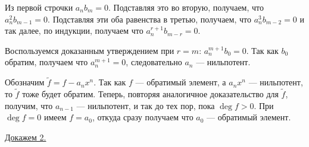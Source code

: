 \begin{Proof}
\begin{Proof}
            Из первой строчки $a_nb_m = 0$. Подставляя это во вторую, получаем, что $a_n^2b_{m - 1} = 0$. Подставляя эти оба равенства в третью,
            получаем, что $a_n^3b_{m - 2} = 0$ и так далее, по индукции, получаем что $a_n^{r + 1}b_{m - r} = 0$.
        \end{Proof}
        
        Воспользуемся доказанным утверждением при $r = m$: $a_n^{m + 1}b_0 = 0$. Так как $b_0$ обратим, получаем что $a_n^{m + 1} = 0$, следовательно $a_n$ --- нильпотент.

        Обозначим $\tilde{f} = f - a_nx^n$. Так как $f$ --- обратимый элемент, а $a_nx^n$ --- нильпотент, то $\tilde{f}$ тоже будет обратим. Теперь, повторяя аналогичное доказательство для $\tilde{f}$,
        получим, что $a_{n - 1}$ --- нильпотент, и так до тех пор, пока $\deg f > 0$. При $\deg f = 0$ имеем $f = a_0$, откуда сразу получаем что $a_0$ --- обратимый элемент. 
    \end{Proof}
    \underline{Докажем 2.}

